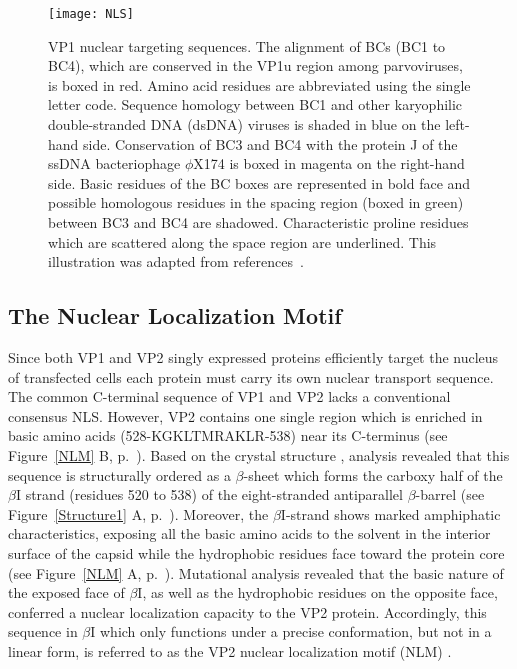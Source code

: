 \begin{figure}[H]
\centering
  \texttt{[image: NLS]} \\[0.5cm]
  \caption[Nuclear Localization Signal]
   {VP1 nuclear targeting sequences. The alignment of BCs (BC1 to BC4), which are conserved in the VP1u region among parvoviruses, is boxed in red. Amino acid residues are abbreviated using the single letter code. Sequence homology between BC1 and other karyophilic double-stranded DNA (dsDNA) viruses is shaded in blue on the left-hand side. Conservation of BC3 and BC4 with the protein J of the ssDNA bacteriophage $\phi$X174 is boxed in magenta on the right-hand side. Basic residues of the BC boxes are represented in bold face and possible homologous residues in the spacing region (boxed in green) between BC3 and BC4 are shadowed. Characteristic proline residues which are scattered along the space region are underlined. This illustration was adapted from references~\cite{pmid12072505, almendral}.}
\label{NLS}
\end{figure}
\clearpage

\subsection{The Nuclear Localization Motif}
\label{NLM1}
Since both VP1 and VP2 singly expressed proteins efficiently target the nucleus of transfected cells \cite{pmid8416366, pmid12072505} each protein must carry its own nuclear transport sequence. The common C-terminal sequence of VP1 and VP2 lacks a conventional consensus NLS. However, VP2 contains one single region which is enriched in basic amino acids (528-KGKLTMRAKLR-538) near its C-terminus (see Figure~\ref{NLM} B, p.~\pageref{NLM}). Based on the crystal structure \cite{pmid9817841, pmid2006420}, analysis revealed that this sequence is structurally ordered as a $\beta$-sheet which forms the carboxy half of the $\beta$I strand (residues 520 to 538) of the eight-stranded antiparallel $\beta$-barrel (see Figure~\ref{Structure1} A, p.~\pageref{Structure1}). Moreover, the $\beta$I-strand shows marked amphiphatic characteristics, exposing all the basic amino acids to the solvent in the interior surface of the capsid while the hydrophobic residues face toward the protein core (see Figure~\ref{NLM} A, p.~\pageref{NLM}). Mutational analysis revealed that the basic nature of the exposed face of $\beta$I, as well as the hydrophobic residues on the opposite face, conferred a nuclear localization capacity to the VP2 protein. Accordingly, this sequence in $\beta$I which only functions under a precise conformation, but not in a linear form, is referred to as the VP2 nuclear localization motif (NLM) \cite{pmid10729155}.        

